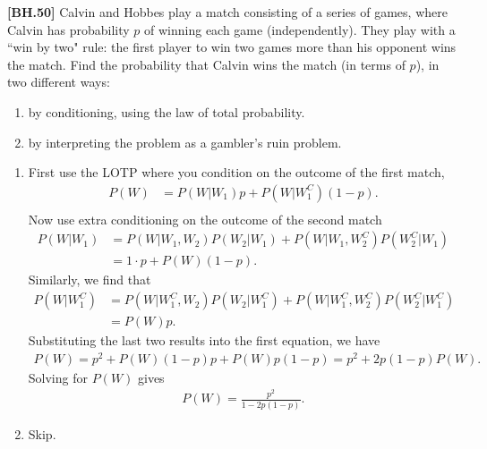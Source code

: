 

\setcounter{theorem}{20}
\begin{exercise}
	\textbf{[BH.50]} Calvin and Hobbes play a match consisting of a series of games, where Calvin has probability $p$ of winning each game (independently). They play with a ``win by two" rule: the first player to win two games more than his opponent wins the match. Find the probability that Calvin wins the match (in terms of $p$), in two different ways:
	\begin{enumerate}
		\item by conditioning, using the law of total probability.
		\item by interpreting the problem as a gambler's ruin problem.
	\end{enumerate}
\begin{solution}
	\begin{enumerate}
		\item First use the LOTP where you condition on the outcome of the first match,
		\begin{align*}
			P(W)& = P(W|W_{1})p + P(W|W_{1}^{C})(1-p).\\
		\end{align*}
		Now use extra conditioning on the outcome of the second match
		\begin{align*}
			P(W|W_{1})& = P(W|W_{1},W_{2})P(W_{2}|W_{1}) + P(W|W_{1},W_{2}^C)P(W_{2}^C|W_{1})\\
			&=1\cdot p + P(W)(1-p).
		\end{align*}
		Similarly, we find that
		\begin{align*}
			P(W|W_{1}^{C}) &= P(W|W_{1}^{C},W_{2})P(W_{2}|W_{1}^{C})+P(W|W_{1}^{C},W_{2}^C)P(W_{2}^C|W_{1}^{C})\\
			&=P(W)p.
		\end{align*}
		Substituting the last two results into the first equation, we have
		\begin{align*}
			P(W) = p^2 + P(W)(1-p)p + P(W)p(1-p) = p^2 +2p(1-p)P(W).
		\end{align*}
		Solving for $P(W)$ gives
		\begin{align*}
			P(W) =\frac{p^2}{1-2p(1-p)}.
		\end{align*}
		\item Skip.
	\end{enumerate}
\end{solution}
\end{exercise}

